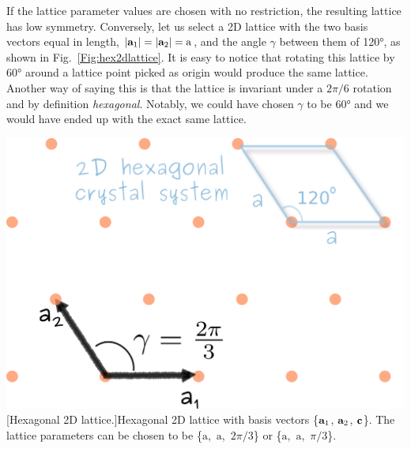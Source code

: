 \vspace{0.4cm}

\noindent \begin{minipage}{0.5\linewidth}
If the lattice parameter values are chosen with no restriction, the resulting lattice has low symmetry. Conversely, let us select a 2D lattice with the two basis vectors equal in length, $|\vb{a}_1|=|\vb{a}_2|=\mathrm{a}$\footnotemark, and the angle $\gamma$ between them of 120\si{\degree}, as shown in Fig.~\ref{Fig:hex2dlattice}. It is easy to notice that rotating this lattice by 60\si{\degree} around a lattice point picked as origin would produce the same lattice. Another way of saying this is that the lattice is invariant under a $2\pi/6$ rotation and by definition \textit{hexagonal}. Notably, we could have chosen $\gamma$ to be 60\si{\degree} and we would have ended up with the exact same lattice. 

\end{minipage}\hspace{0.5cm}
\begin{minipage}{0.5\linewidth}
 \centering
\includegraphics[width=1\linewidth]{Figures/hex2Dlattice.png}
\captionsetup{width=.8\linewidth}
[Hexagonal 2D lattice.]{Hexagonal 2D lattice with basis vectors \{$\vb{a}_1$, $\vb{a}_2$, $\vb{c}$\}. The lattice parameters can be chosen to be \{$\mathrm{a}$,~$\mathrm{a}$,~$2\pi/3$\} or  \{$\mathrm{a}$,~$\mathrm{a}$,~$\pi/3$\}. }
\label{Fig:hex2dlattice}
\end{minipage}
 
\vspace{0.5cm}

